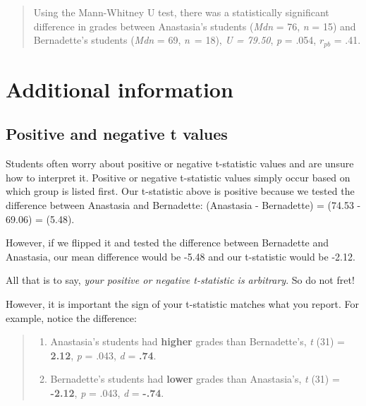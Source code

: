 \documentclass[
]{book}
\providecommand{\tightlist}{%
  \setlength{\itemsep}{0pt}\setlength{\parskip}{0pt}}
\begin{document}
\begin{quote}
Using the Mann-Whitney U test, there was a statistically significant difference in grades between Anastasia's students (\emph{Mdn} = 76, \emph{n} = 15) and Bernadette's students (\emph{Mdn} = 69, \emph{n}~= 18), \emph{U = 79.50}, \emph{p} = .054, \(r_{pb}\) = .41.
\end{quote}

\hypertarget{additional-information}{%
\section{Additional information}\label{additional-information}}

\hypertarget{positive-and-negative-t-values}{%
\subsection{Positive and negative t values}\label{positive-and-negative-t-values}}

Students often worry about positive or negative t-statistic values and are unsure how to interpret it. Positive or negative t-statistic values simply occur based on which group is listed first. Our t-statistic above is positive because we tested the difference between Anastasia and Bernadette: (Anastasia - Bernadette) = (74.53 - 69.06) = (5.48).

However, if we flipped it and tested the difference between Bernadette and Anastasia, our mean difference would be -5.48 and our t-statistic would be -2.12.

All that is to say, \emph{your positive or negative t-statistic is arbitrary}. So do not fret!

However, it is important the sign of your t-statistic matches what you report. For example, notice the difference:

\begin{quote}
\begin{enumerate}
\def\labelenumi{\arabic{enumi}.}
\tightlist
\item
  Anastasia's students had \textbf{higher} grades than Bernadette's, \emph{t} (31) = \textbf{2.12}, \emph{p} = .043, \emph{d} = \textbf{.74}.
\item
  Bernadette's students had \textbf{lower} grades than Anastasia's, \emph{t} (31) = \textbf{-2.12}, \emph{p} = .043, \emph{d} = \textbf{-.74}.
\end{enumerate}
\end{quote}
\end{document}
